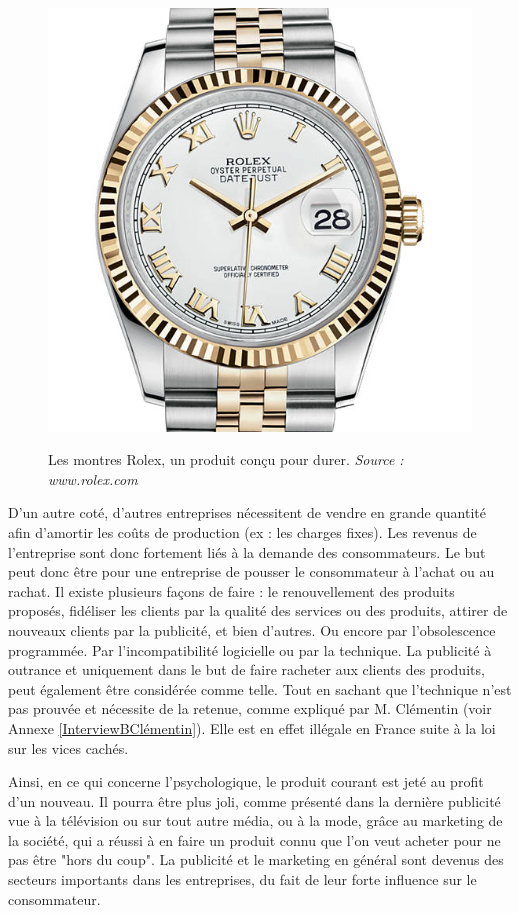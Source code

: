 \begin{figure}
~\includegraphics[scale=0.2]{Rsc/montre_rolex.jpg} 
\caption{Les montres Rolex, un produit conçu pour durer. \textit{Source : www.rolex.com}}
\label{Rolex}
\end{figure} 


\bigbreak
D'un autre coté, d'autres entreprises nécessitent de vendre en grande quantité afin d'amortir les coûts de production (ex : les charges fixes). Les revenus de l'entreprise sont donc fortement liés à la demande des consommateurs. Le but peut donc être pour une entreprise de pousser le consommateur à l'achat ou au rachat. Il existe plusieurs façons de faire :  le renouvellement des produits proposés, fidéliser les clients par la qualité des services ou des produits, attirer de nouveaux clients par la publicité, et bien d'autres. Ou encore par l'obsolescence programmée. Par l'incompatibilité logicielle ou par la technique. La publicité à outrance et uniquement dans le but de faire racheter aux clients des produits, peut également être considérée comme telle. Tout en sachant que l'\op technique n'est pas prouvée et nécessite de la retenue, comme expliqué par M. Clémentin (voir Annexe \ref{InterviewBClémentin}). Elle est en effet illégale en France suite à la loi sur les vices cachés.

\bigbreak
Ainsi, en ce qui concerne l'\op psychologique, le produit courant est jeté au profit d'un nouveau. Il pourra être plus joli, comme présenté dans la dernière publicité vue à la télévision ou sur tout autre média, ou à la mode, grâce au marketing de la société, qui a réussi à en faire un produit connu que l'on veut acheter pour ne pas être "hors du coup". La publicité et le marketing en général sont devenus des secteurs importants dans les entreprises, du fait de leur forte influence sur le consommateur.

